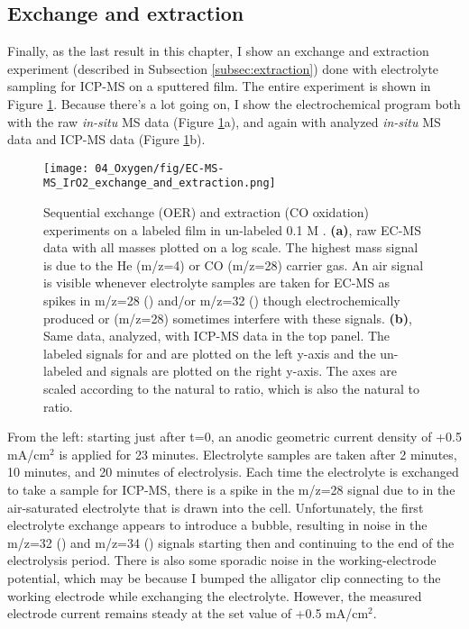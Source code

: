 \subsection{Exchange and extraction}

Finally, as the last result in this chapter, I show an exchange and extraction experiment (described in Subsection \ref{subsec:extraction}) done with electrolyte sampling for ICP-MS on a sputtered  film. The entire experiment is shown in Figure \ref{fig:EC-MS-MS_extraction}. Because there's a lot going on, I show the electrochemical program both with the raw \textit{in-situ} MS data (Figure \ref{fig:EC-MS-MS_extraction}a), and again with analyzed \textit{in-situ} MS data and ICP-MS data (Figure \ref{fig:EC-MS-MS_extraction}b). 

\begin{figure}[h!]
	\texttt{[image: 04\_Oxygen/fig/EC-MS-MS\_IrO2\_exchange\_and\_extraction.png]}
	\caption{Sequential exchange (OER) and extraction (CO oxidation) experiments on a labeled  film in un-labeled 0.1 M . \textbf{(a)}, raw EC-MS data with all masses plotted on a log scale. The highest mass signal is due to the He (m/z=4) or CO (m/z=28) carrier gas. An air signal is visible whenever electrolyte samples are taken for EC-MS as spikes in m/z=28 () and/or m/z=32 () though electrochemically produced  or  (m/z=28) sometimes interfere with these signals. \textbf{(b)}, Same data, analyzed, with ICP-MS data in the top panel. The labeled signals for  and  are plotted on the left y-axis and the un-labeled  and  signals are plotted on the right y-axis. The axes are scaled according to the natural  to  ratio, which is also the natural  to  ratio.
	}
	\label{fig:EC-MS-MS_extraction}
\end{figure}

From the left: starting just after t=0, an anodic geometric current density of +0.5 mA/cm$^2$ is applied for 23 minutes. Electrolyte samples are taken after 2 minutes, 10 minutes, and 20 minutes of electrolysis. Each time the electrolyte is exchanged to take a sample for ICP-MS, there is a spike in the m/z=28 signal due to  in the air-saturated electrolyte that is drawn into the cell. Unfortunately, the first electrolyte exchange appears to introduce a bubble, resulting in noise in the m/z=32 () and m/z=34 () signals starting then and continuing to the end of the electrolysis period. There is also some sporadic noise in the working-electrode potential, which may be because I bumped the alligator clip connecting to the working electrode while exchanging the electrolyte. However, the measured electrode current remains steady at the set value of +0.5 mA/cm$^2$.

